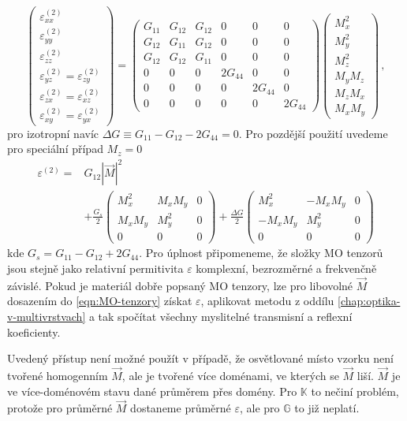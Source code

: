 \begin{equation}
    \begin{pmatrix}
        \varepsilon^{(2)}_{xx} \\ \varepsilon^{(2)}_{yy} \\ \varepsilon^{(2)}_{zz} 
        \\ \varepsilon^{(2)}_{yz}=\varepsilon^{(2)}_{zy} 
        \\ \varepsilon^{(2)}_{zx}=\varepsilon^{(2)}_{xz} 
        \\ \varepsilon^{(2)}_{xy}=\varepsilon^{(2)}_{yx}
    \end{pmatrix}
    =\begin{pmatrix}
        G_{11} & G_{12} & G_{12} & 0 & 0 & 0 \\
        G_{12} & G_{11} & G_{12} & 0 & 0 & 0 \\
        G_{12} & G_{12} & G_{11} & 0 & 0 & 0 \\
        0 & 0 & 0 & 2G_{44} & 0 & 0 \\
        0 & 0 & 0 & 0 & 2G_{44} & 0 \\
        0 & 0 & 0 & 0 & 0 & 2G_{44}
    \end{pmatrix}
    \begin{pmatrix} M_x^2 \\ M_y^2 \\ M_z^2 \\ M_y M_z \\ M_z M_x \\ M_x M_y \end{pmatrix} \,,
\end{equation}
pro izotropní navíc $\Delta G \equiv G_{11}-G_{12}-2G_{44}=0$.
Pro pozdější použití uvedeme pro speciální případ $M_z=0$
\begin{align}
    \varepsilon^{(2)} =& G_{12} |\vec{M}|^2 \\ 
    &+ \frac{G_s}{2} \begin{pmatrix}
        M_x^2 & M_x M_y & 0 \\ M_x M_y & M_y^2 & 0 \\ 0 & 0 & 0
    \end{pmatrix}
    + \frac{\Delta G}{2} \begin{pmatrix}
        M_x^2 & -M_xM_y & 0 \\ -M_xM_y & M_y^2 & 0 \\ 0 & 0 & 0
    \end{pmatrix}
\end{align}
kde $G_s=G_{11}-G_{12}+2G_{44}$.
Pro úplnost připomeneme, že složky MO tenzorů jsou stejně jako relativní permitivita $\varepsilon$ komplexní, bezrozměrné a frekvenčně závislé.
Pokud je materiál dobře popsaný MO tenzory, lze pro libovolné $\vec{M}$ dosazením do \eqref{eqn:MO-tenzory} získat $\varepsilon$, aplikovat metodu z oddílu \ref{chap:optika-v-multivrstvach} a tak spočítat všechny myslitelné transmisní a reflexní koeficienty.

Uvedený přístup není možné použít v případě, že osvětlované místo vzorku není tvořené homogenním $\vec{M}$, ale je tvořené více doménami, ve kterých se $\vec{M}$ liší.
$\vec{M}$ je ve více-doménovém stavu dané průměrem přes domény.
Pro $\mathbb{K}$ to nečiní problém, protože pro průměrné $\vec{M}$ dostaneme průměrné $\varepsilon$, ale pro $\mathbb{G}$ to již neplatí.
